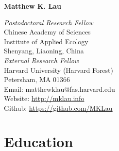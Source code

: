 \documentclass[a4paper]{article}
\author{}
\date{}
\begin{document}
\textbf{\Large Matthew K. Lau} \\

\hline

\begin{multicols}{2}
\textit{Postodoctoral Research Fellow} \\
Chinese Academy of Sciences \\
Institute of Applied Ecology \\
Shenyang, Liaoning, China \\
\textit{External Research Fellow} \\
Harvard University (Harvard Forest) \\
Petersham, MA 01366 \\
Email: matthewklau@fas.harvard.edu \\
Website: \url{http://mklau.info} \\
Github: \url{https://github.com/MKLau} \\
\end{multicols}

\section{Education}\label{education}
\end{document}
